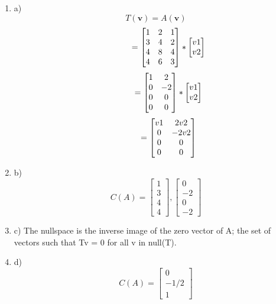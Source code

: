 \documentclass[11pt]{article}
\begin{document}
\begin{enumerate}
\begin{enumerate}
        \item a)
        $$
        T(\mathbf{v}) = A(\mathbf{v})
        $$
        $$
        \hskip 30pt = \begin{bmatrix} 1 & 2 & 1 \\
        3 & 4 & 2 \\
        4 & 8 & 4 \\
        4 & 6 & 3
        \end{bmatrix} * \begin{bmatrix} v1 \\ v2 \end{bmatrix}
        $$
        $$
        \hskip 30pt = \begin{bmatrix} 1 & 2 \\
        0 & -2 \\
        0 & 0 \\
        0 & 0
        \end{bmatrix} * \begin{bmatrix} v1 \\ v2 \end{bmatrix}
        $$
        $$
        \hskip 30pt = \begin{bmatrix} v1 & 2v2 \\
        0 & -2v2 \\
        0 & 0 \\
        0 & 0
        \end{bmatrix}
        $$

        \vskip 06pt
        \item b)
        $$
        C(A) = \begin{bmatrix} 1 \\ 3 \\ 4 \\ 4 \end{bmatrix} , \begin{bmatrix} 0 \\ -2 \\ 0 \\ -2 \end{bmatrix}
        $$

        \vskip 06pt
        \item c) The nullspace is the inverse image of the zero vector of A; the set of vectors such that Tv = 0 for all v in null(T).

        \vskip 06pt
        \item d)
        $$
        C(A) = \begin{bmatrix} 0 \\ -1/2 \\ 1 \end{bmatrix}
        $$


\end{enumerate}
\end{enumerate}
\end{document}

